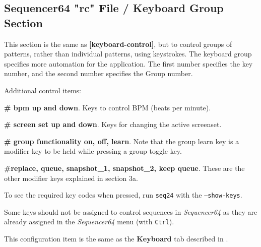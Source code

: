\subsection{Sequencer64 "rc" File / Keyboard Group Section}
\label{subsec:seq64_rc_file_keyboard_group}

   This section is the same as
   \textbf{[keyboard-control]}, but to control groups of patterns, rather than
   individual patterns, using keystrokes.
   The keyboard group specifies more automation for the application.  The
   first number specifies the key number, and the second number specifies
   the Group number.

   Additional control items:

   \begin{enumber}
      \item \textbf{\# bpm up and down}.
         Keys to control BPM (beats per minute).
      \item \textbf{\# screen set up and down}.
         Keys for changing the active screenset.
      \item \textbf{\# group functionality on, off, learn}.
         Note that the group learn key is a modifier key to be held while 
         pressing a group toggle key.
      \item \textbf{\#replace, queue, snapshot\_1, snapshot\_2, keep queue}.
         These are the other modifier keys explained in section 3a.
   \end{enumber}

   To see the required key codes when pressed, run \texttt{seq24} with
   the \texttt{--show-keys}.

   Some keys should not be assigned to control sequences in
   \textsl{Sequencer64} as they are already assigned in the
   \textsl{Sequencer64} menu (with \texttt{Ctrl}). 

   This configuration item is the same as the 
   \textbf{Keyboard} tab described in
   .

